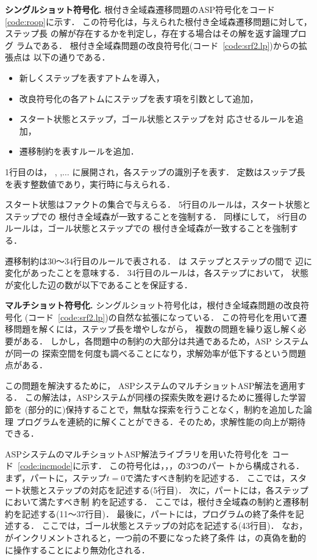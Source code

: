 \textbf{シングルショット符号化.}
根付き全域森遷移問題のASP符号化をコード\ref{code:roop}に示す．
この符号化は，与えられた根付き全域森遷移問題に対して，ステップ長
の解が存在するかを判定し，存在する場合はその解を返す論理プログ
ラムである．
根付き全域森問題の改良符号化(コード~\ref{code:srf2.lp})からの拡張点は
以下の通りである．
\begin{itemize}
\item 新しくステップを表すアトムを導入，
\item 改良符号化の各アトムにステップを表す項を引数として追加，
\item スタート状態とステップ，ゴール状態とステップを対
  応させるルールを追加，
\item 遷移制約を表すルールを追加．
\end{itemize}
1行目のは，
,
,$\dots$
に展開され，各ステップの識別子を表す．
定数はスッテプ長を表す整数値であり，実行時に与えられる．

スタート状態はファクトの集合で与えらる．
5行目のルールは，スタート状態とステップでの
根付き全域森が一致することを強制する．
同様にして，
8行目のルールは，ゴール状態とステップでの
根付き全域森が一致することを強制する．

遷移制約は30〜34行目のルールで表される．
は
ステップとステップの間で
辺に変化があったことを意味する．
34行目のルールは，各ステップにおいて，
状態が変化した辺の数が以下であることを保証する．

\textbf{マルチショット符号化.}
シングルショット符号化は，根付き全域森問題の改良符号化
(コード~\ref{code:srf2.lp})の自然な拡張になっている．
この符号化を用いて遷移問題を解くには，ステップ長を増やしながら，
複数の問題を繰り返し解く必要がある．
しかし，各問題中の制約の大部分は共通であるため，ASP システムが同一の
探索空間を何度も調べることになり，求解効率が低下するという問題点がある．

この問題を解決するために，
ASPシステム{\clingo}のマルチショットASP解法を適用する．
この解法は，ASPシステムが同様の探索失敗を避けるために獲得した学習節を
(部分的に)保持することで，無駄な探索を行うことなく，制約を追加した論理
プログラムを連続的に解くことができる．そのため，求解性能の向上が期待できる．

ASPシステム{\clingo}のマルチショットASP解法ライブラリを用いた符号化を
コード~\ref{code:incmode}に示す．
この符号化は，，，の3つのパー
トから構成される．
%
まず，パートに，ステップ$t=0$で満たすべき制約を記述する．
ここでは，スタート状態とステップの対応を記述する(5行目)．
%
次に，パートには，各ステップにおいて満たすべき制
約を記述する．
ここでは，根付き全域森の制約と遷移制約を記述する(11〜37行目)．
%
最後に，パートには，プログラムの終了条件を記述する．
ここでは，ゴール状態とステップの対応を記述する(43行目)．
なお，がインクリメントされると，一つ前の不要になった終了条件
は，の真偽を動的に操作することにより無効化される．

